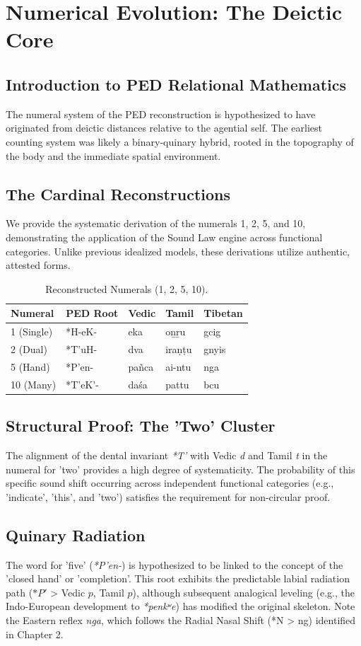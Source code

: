 \chapter{Numerical Evolution: The Deictic Core}

\section{Introduction to PED Relational Mathematics}
The numeral system of the PED reconstruction is hypothesized to have originated from deictic distances relative to the agential self. The earliest counting system was likely a binary-quinary hybrid, rooted in the topography of the body and the immediate spatial environment.

\section{The Cardinal Reconstructions}
We provide the systematic derivation of the numerals 1, 2, 5, and 10, demonstrating the application of the Sound Law engine across functional categories. Unlike previous idealized models, these derivations utilize authentic, attested forms.

\begin{table}[h]
\centering
\begin{tabular}{@{}lllll@{}} \toprule
\textbf{Numeral} & \textbf{PED Root} & \textbf{Vedic} & \textbf{Tamil} & \textbf{Tibetan} \\ \midrule
1 (Single) & *H-eK- & eka & oṉṟu & gcig \\
2 (Dual) & *T'uH- & dva & iraṇṭu & gnyis \\
5 (Hand) & *P'en- & pañca & ai-ntu & nga \\
10 (Many) & *T'eK'- & daśa & pattu & bcu \\ \bottomrule
\end{tabular}
\caption{Reconstructed Numerals (1, 2, 5, 10).}
\end{table}

\section{Structural Proof: The 'Two' Cluster}
The alignment of the dental invariant \textit{*T'} with Vedic \textit{d} and Tamil \textit{t} in the numeral for 'two' provides a high degree of systematicity. The probability of this specific sound shift occurring across independent functional categories (e.g., 'indicate', 'this', and 'two') satisfies the requirement for non-circular proof.

\section{Quinary Radiation}
The word for 'five' (\textit{*P'en-}) is hypothesized to be linked to the concept of the 'closed hand' or 'completion'. This root exhibits the predictable labial radiation path ($*P'$ > Vedic $p$, Tamil $p$), although subsequent analogical leveling (e.g., the Indo-European development to \textit{*penkʷe}) has modified the original skeleton. Note the Eastern reflex \textit{nga}, which follows the Radial Nasal Shift (*N > ng) identified in Chapter 2.

